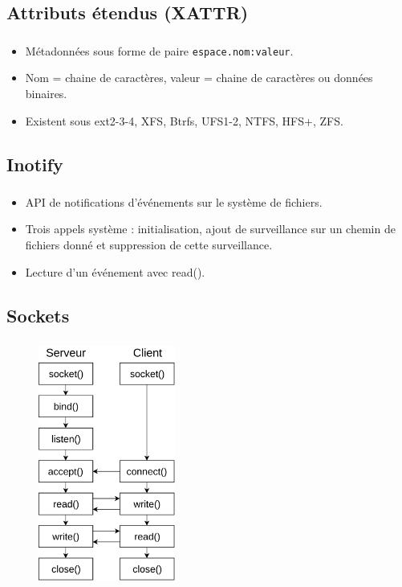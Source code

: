 \documentclass[10pt]{beamer}
\begin{document}
\subsection{Attributs étendus (XATTR)}
\begin{frame}
    \frametitle{\subsecname}
    \begin{itemize}
        \item Métadonnées sous forme de paire \texttt{espace.nom:valeur}.
        \item Nom = chaine de caractères, valeur = chaine de caractères ou données binaires.
        \item Existent sous ext2-3-4, XFS, Btrfs, UFS1-2, NTFS, HFS+, ZFS.
    \end{itemize}
\end{frame}

\subsection{Inotify}
\begin{frame}
    \frametitle{\subsecname}
    \begin{itemize}
        \item API de notifications d’événements sur le système de fichiers.
        \item Trois appels système : initialisation, ajout de surveillance sur un chemin de fichiers 
            donné et suppression de cette surveillance.
        \item Lecture d’un événement avec read().
    \end{itemize}
\end{frame}

\subsection{Sockets}
\begin{frame}
    \frametitle{\subsecname}
    \begin{center}
        \begin{figure}
            \includegraphics[width=0.4\textwidth]{images/sockets.png}
        \end{figure}
    \end{center}
\end{frame}
\end{document}
